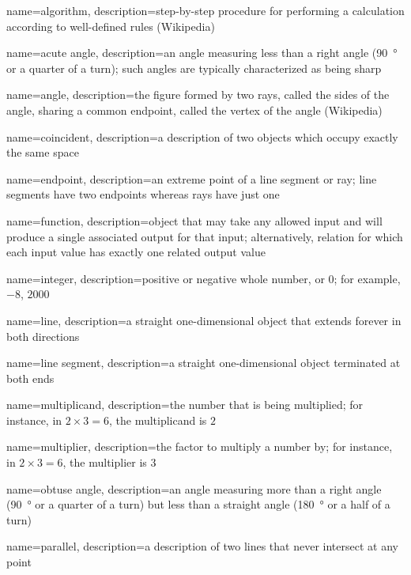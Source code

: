 {
  name=algorithm,
  description={step-by-step procedure for performing a calculation
  according to well-defined rules (Wikipedia)}
}

{
  name=acute angle,
  description={an angle measuring less than a right angle (\SI{90}{\degree} or a
  quarter of a turn); such angles are typically characterized as being sharp}
}

{
  name=angle,
  description={the figure formed by two rays, called the sides of the angle,
  sharing a common endpoint, called the vertex of the angle (Wikipedia)}
}

{
  name=coincident,
  description={a description of two objects which occupy exactly the same space}
}

{
  name=endpoint,
  description={an extreme point of a line segment or ray; line segments have two
  endpoints whereas rays have just one}
}

{
  name=function,
  description={object that may take any allowed input and will produce a
  single associated output for that input; alternatively, relation for
  which each input value has exactly one related output value}
}

{
  name=integer,
  description={positive or negative whole number, or $0$; for example,
  $-8$, $2000$}
}

{
  name=line,
  description={a straight one-dimensional object that extends forever in both
  directions}
}

{
  name=line segment,
  description={a straight one-dimensional object terminated at both ends}
}

{
  name=multiplicand,
  description={the number that is being multiplied; for instance, in
  $2\times3=6$, the multiplicand is $2$}
}

{
  name=multiplier,
  description={the factor to multiply a number by; for instance, in
  $2\times3=6$, the multiplier is $3$}
}

{
  name=obtuse angle,
  description={an angle measuring more than a right angle (\SI{90}{\degree} or a
  quarter of a turn) but less than a straight angle (\SI{180}{\degree} or a half
  of a turn)}
}

{
  name=parallel,
  description={a description of two lines that never intersect at any point}
}

